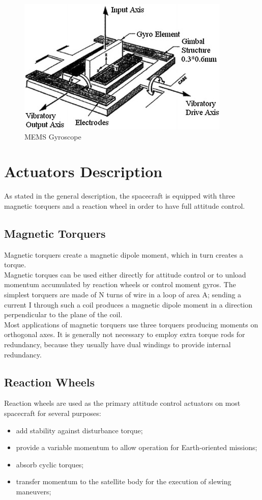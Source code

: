 \documentclass[11pt,a4paper]{report}
\begin{document}
\begin{figure}[H]
 	\centering
 	\includegraphics[scale=0.3]{gfx/mems_gyro.jpg}
    \caption{MEMS Gyroscope}
\end{figure}

\section{Actuators Description}
As stated in the general description, the spacecraft is equipped with three magnetic torquers and a reaction wheel in order to have full attitude control.
\subsection{Magnetic Torquers}
Magnetic torquers create a magnetic dipole moment, which in turn creates a
torque.\\
Magnetic torques can be used either directly for attitude control or to unload momentum accumulated by reaction wheels or control moment gyros. The simplest torquers are made of N turns of wire in a loop of area A; sending a current
I through such a coil produces a magnetic dipole moment in a direction perpendicular to the plane of the coil. \\
Most applications of magnetic torquers use three torquers producing moments
on orthogonal axes. It is generally not necessary to employ extra torque rods
for redundancy, because they usually have dual windings to provide internal
redundancy. 

\subsection{Reaction Wheels}
Reaction wheels are used as the primary attitude control actuators on most spacecraft for several purposes: 

\begin{itemize}
 \item add stability against disturbance torque;
 \item provide a variable momentum to allow operation for Earth-oriented missions;
 \item absorb cyclic torques;
 \item transfer momentum to the satellite body for the execution of slewing maneuvers;
\end{itemize}
\end{document}
